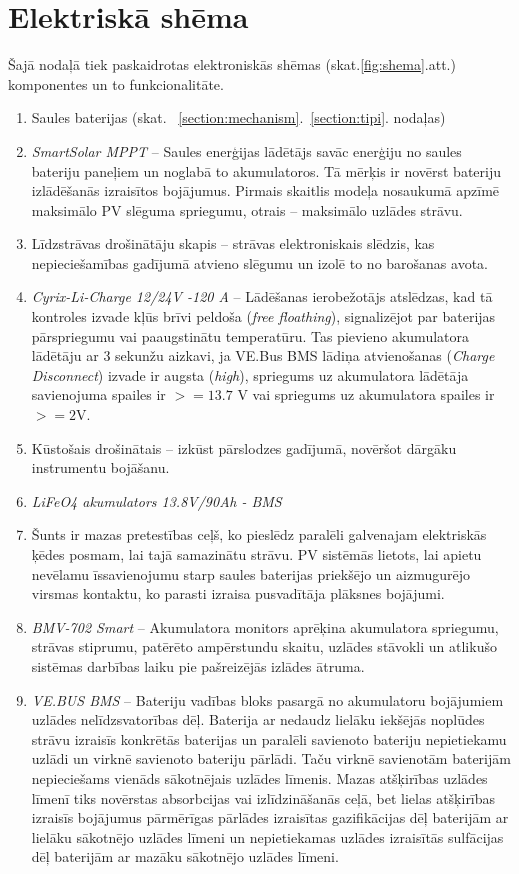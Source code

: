 
\section{Elektriskā shēma}

Šajā nodaļā tiek paskaidrotas elektroniskās shēmas (skat.\ref{fig:shema}.att.) komponentes un to funkcionalitāte.

\begin{enumerate}
\item Saules baterijas (skat. ~\ref{section:mechanism}.~\ref{section:tipi}. nodaļas)
\item \emph{SmartSolar MPPT} --
Saules enerģijas lādētājs savāc enerģiju no saules bateriju paneļiem un noglabā to akumulatoros. Tā mērķis ir novērst bateriju izlādēšanās izraisītos bojājumus. Pirmais skaitlis modeļa nosaukumā apzīmē maksimālo PV slēguma spriegumu, otrais -- maksimālo uzlādes strāvu.
\item Līdzstrāvas drošinātāju skapis --
strāvas elektroniskais slēdzis, kas nepieciešamības gadījumā atvieno slēgumu un izolē to no barošanas avota.
\item \emph{Cyrix-Li-Charge 12/24V -120 A} --
Lādēšanas ierobežotājs atslēdzas, kad tā kontroles izvade kļūs brīvi peldoša (\textit{free floathing}), signalizējot par baterijas pārspriegumu vai paaugstinātu temperatūru. Tas pievieno akumulatora lādētāju ar 3 sekunžu aizkavi, ja VE.Bus BMS lādiņa atvienošanas (\textit{Charge Disconnect}) izvade ir augsta (\textit{high}), spriegums uz akumulatora lādētāja savienojuma spailes ir $>= 13.7$ V vai spriegums uz akumulatora spailes ir $>= 2$V.
\item Kūstošais drošinātais --
izkūst pārslodzes gadījumā, novēršot dārgāku instrumentu bojāšanu.
\item \emph{LiFeO4 akumulators 13.8V/90Ah - BMS}
\item Šunts ir mazas pretestības ceļš, ko pieslēdz paralēli galvenajam elektriskās ķēdes posmam, lai tajā samazinātu strāvu. PV sistēmās lietots, lai apietu nevēlamu īssavienojumu starp saules baterijas priekšējo un aizmugurējo virsmas kontaktu, ko parasti izraisa pusvadītāja plāksnes bojājumi.
\item \emph{BMV-702 Smart} --
Akumulatora monitors aprēķina akumulatora spriegumu, strāvas stiprumu, patērēto ampērstundu skaitu, uzlādes stāvokli un atlikušo sistēmas darbības laiku pie pašreizējās izlādes ātruma.
\item \emph{VE.BUS BMS} --
Bateriju vadības bloks pasargā no akumulatoru bojājumiem uzlādes nelīdzsvatorības dēļ. Baterija ar nedaudz lielāku iekšējās noplūdes strāvu
izraisīs konkrētās baterijas un paralēli savienoto bateriju nepietiekamu uzlādi un virknē savienoto bateriju pārlādi. Taču virknē savienotām baterijām nepieciešams vienāds sākotnējais uzlādes līmenis. Mazas atšķirības uzlādes līmenī tiks novērstas absorbcijas vai izlīdzināšanās ceļā, bet lielas atšķirības izraisīs bojājumus pārmērīgas pārlādes izraisītas gazifikācijas dēļ baterijām ar lielāku sākotnējo uzlādes līmeni un nepietiekamas uzlādes izraisītās sulfācijas dēļ baterijām ar mazāku sākotnējo uzlādes līmeni.


\end{enumerate}
